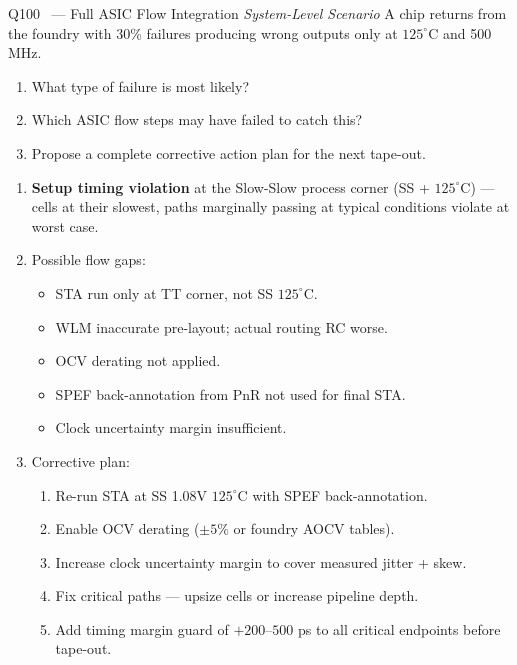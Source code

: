 \documentclass[12pt,a4paper]{article}
\newcommand{\advanced}{%
  \fbox{\textcolor{advred}{\bfseries\sffamily\small ADVANCED}}}
\begin{document}
\begin{questionbox}{Q100 \advanced\ --- Full ASIC Flow Integration \hfill\textit{System-Level Scenario}}
A chip returns from the foundry with 30\% failures producing wrong outputs only at $125^\circ\text{C}$ and 500 MHz.
\begin{enumerate}[label=\textbf{\alph*)}]
  \item What type of failure is most likely?
  \item Which ASIC flow steps may have failed to catch this?
  \item Propose a complete corrective action plan for the next tape-out.
\end{enumerate}
\end{questionbox}

\begin{answerbox}
\begin{enumerate}[label=\textbf{\alph*)}]
  \item \textbf{Setup timing violation} at the Slow-Slow process corner (SS + $125^\circ\text{C}$) --- cells at their slowest, paths marginally passing at typical conditions violate at worst case.
  \item Possible flow gaps:
    \begin{itemize}
      \item STA run only at TT corner, not SS $125^\circ\text{C}$.
      \item WLM inaccurate pre-layout; actual routing RC worse.
      \item OCV derating not applied.
      \item SPEF back-annotation from PnR not used for final STA.
      \item Clock uncertainty margin insufficient.
    \end{itemize}
  \item Corrective plan:
    \begin{enumerate}
      \item Re-run STA at SS 1.08V $125^\circ\text{C}$ with SPEF back-annotation.
      \item Enable OCV derating ($\pm5\%$ or foundry AOCV tables).
      \item Increase clock uncertainty margin to cover measured jitter + skew.
      \item Fix critical paths --- upsize cells or increase pipeline depth.
      \item Add timing margin guard of $+200$--$500$ ps to all critical endpoints before tape-out.
    \end{enumerate}
\end{enumerate}
\end{answerbox}
\end{document}
